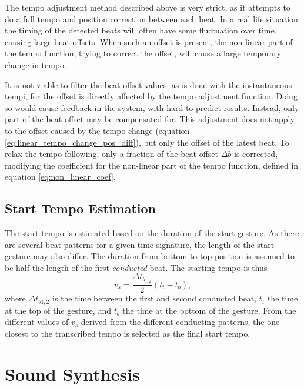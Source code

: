 The tempo adjustment method described above is very strict,
as it attempts to do a full tempo and position correction
between each beat.
In a real life situation
the timing of the detected beats will often have some
fluctuation over time,
causing large beat offsets.
When such an offset is present,
the non-linear part of the tempo function,
trying to correct the offset,
will cause a large temporary change in tempo.

It is not viable to filter the beat offset values,
as is done with the instantaneous tempi,
for the offset is directly affected by
the tempo adjustment function.
Doing so would cause feedback in the system,
with hard to predict results.
Instead, only part of the beat offset may be compensated for.
This adjustment does not apply to
the offset caused by the tempo change
(equation \ref{eq:linear_tempo_change_pos_diff}),
but only the offset of the latest beat.
To relax the tempo following,
only a fraction of the beat offset $\Delta b$ is corrected,
modifying the coefficient for the non-linear 
part of the tempo function, defined in equation
\ref{eq:non_linear_coef}.

\section{Start Tempo Estimation}
\label{sec:meth:start_tempo_estimation}

The start tempo is estimated based on
the duration of the start gesture.
As there are several beat patterns for a given time signature,
the length of the start gesture may also differ.
The duration from bottom to top position is
assumed to be half the length of
the first \textit{conducted} beat.
The starting tempo is thus
\begin{equation}
v_s = \frac{\Delta t_{b_{1,2}}}{2} (t_t - t_b),
\end{equation}
where $\Delta t_{b1,2}$ is the
time between the first and second conducted beat,
$t_t$ the time at the top of the gesture,
and $t_b$ the time at the bottom of the gesture.
From the different values of $v_s$ derived from the
different conducting patterns,
the one closest to the transcribed tempo is selected
as the final start tempo.


\chapter{Sound Synthesis}
\label{chapter:sound_synthesis}

